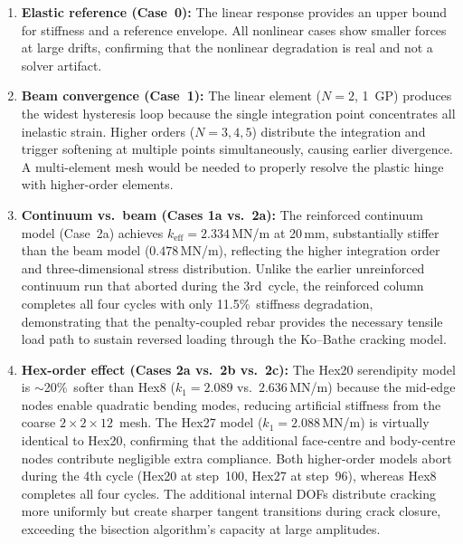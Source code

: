 \begin{enumerate}
  \item \textbf{Elastic reference (Case~0):}  The linear response
    provides an upper bound for stiffness and a reference envelope.
    All nonlinear cases show smaller forces at large drifts, confirming
    that the nonlinear degradation is real and not a solver artifact.

  \item \textbf{Beam convergence (Case~1):} The linear element
    ($N = 2$, 1~GP) produces the widest hysteresis loop because the
    single integration point concentrates all inelastic strain.
    Higher orders ($N = 3, 4, 5$) distribute the integration and
    trigger softening at multiple points simultaneously, causing
    earlier divergence.  A multi-element mesh would be needed to
    properly resolve the plastic hinge with higher-order elements.

  \item \textbf{Continuum vs.\ beam (Cases 1a vs.\ 2a):}  The
    reinforced continuum model (Case~2a) achieves $k_{\text{eff}} =
    2.334$\,MN/m at 20\,mm, substantially stiffer than the beam
    model ($0.478$\,MN/m), reflecting the higher integration order
    and three-dimensional stress distribution.  Unlike the earlier
    unreinforced continuum run that aborted during the 3rd~cycle,
    the reinforced column completes all four cycles with only
    11.5\%~stiffness degradation, demonstrating that the penalty-coupled
    rebar provides the necessary tensile load path to sustain
    reversed loading through the Ko--Bathe cracking model.

  \item \textbf{Hex-order effect (Cases 2a vs.\ 2b vs.\ 2c):}
    The Hex20 serendipity model is $\sim$20\%~softer than Hex8
    ($k_1 = 2.089$ vs.~$2.636$\,MN/m) because the mid-edge nodes
    enable quadratic bending modes, reducing artificial stiffness
    from the coarse $2 \times 2 \times 12$~mesh.  The Hex27 model
    ($k_1 = 2.088$\,MN/m) is virtually identical to Hex20,
    confirming that the additional face-centre and body-centre
    nodes contribute negligible extra compliance.  Both higher-order
    models abort during the 4th cycle (Hex20 at step~100, Hex27 at
    step~96), whereas Hex8 completes all four cycles.  The
    additional internal DOFs distribute cracking more uniformly but
    create sharper tangent transitions during crack closure,
    exceeding the bisection algorithm's capacity at large amplitudes.


\end{enumerate}
